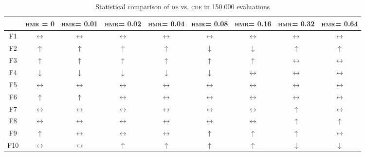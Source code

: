 \begin{table}[!t]
\caption{Statistical comparison of \textsc{de} vs. \textsc{cde} in 150.000 evaluations}
\label{tab:de_vs_cde_stats}
\centering
\begin{scriptsize}
\begin{tabular}{c c c c c c c c c}
\hline
     & \textsc{hmr} = 0  & \textsc{hmr}= 0.01 & \textsc{hmr}= 0.02 & \textsc{hmr}= 0.04 & \textsc{hmr}= 0.08 & \textsc{hmr}= 0.16 & \textsc{hmr}= 0.32 & \textsc{hmr}= 0.64 \\ \hline
F1	 & $\leftrightarrow$ & $\leftrightarrow$  & $\leftrightarrow$  & $\leftrightarrow$  & $\leftrightarrow$  & $\leftrightarrow$  & $\leftrightarrow$  & $\leftrightarrow$ \\ \hline 
F2	 & $\uparrow$        & $\uparrow$         & $\uparrow$         & $\uparrow$         & $\downarrow$       & $\downarrow$       & $\uparrow$         & $\uparrow$ \\ \hline 
F3	 & $\uparrow$        & $\uparrow$         & $\uparrow$         & $\uparrow$         & $\uparrow$         & $\uparrow$         & $\leftrightarrow$  & $\leftrightarrow$ \\ \hline 
F4	 & $\downarrow$      & $\downarrow$       & $\downarrow$       & $\downarrow$       &  $\downarrow$      & $\leftrightarrow$  & $\leftrightarrow$  & $\leftrightarrow$ \\ \hline 
F5	 & $\leftrightarrow$ & $\leftrightarrow$  & $\leftrightarrow$  & $\leftrightarrow$  & $\leftrightarrow$  & $\leftrightarrow$  & $\leftrightarrow$  & $\leftrightarrow$ \\ \hline 
F6	 & $\uparrow$        & $\uparrow$         & $\leftrightarrow$  & $\leftrightarrow$  & $\leftrightarrow$  & $\leftrightarrow$  & $\leftrightarrow$  & $\leftrightarrow$ \\ \hline 
F7	 & $\leftrightarrow$ & $\leftrightarrow$  & $\leftrightarrow$  & $\leftrightarrow$  & $\leftrightarrow$  & $\leftrightarrow$  & $\uparrow$         & $\leftrightarrow$ \\ \hline 
F8	 & $\leftrightarrow$ & $\leftrightarrow$  & $\leftrightarrow$  & $\leftrightarrow$  & $\leftrightarrow$  & $\leftrightarrow$  & $\uparrow$         & $\uparrow$ \\ \hline 
F9	 & $\uparrow$        & $\leftrightarrow$  & $\leftrightarrow$  & $\leftrightarrow$  & $\uparrow$         & $\uparrow$         & $\uparrow$         & $\leftrightarrow$ \\ \hline 
F10	 & $\leftrightarrow$ & $\leftrightarrow$  & $\uparrow$         & $\uparrow$         & $\uparrow$         & $\uparrow$         & $\downarrow$       & $\downarrow$ \\ \hline 

\end{tabular}
\end{scriptsize}
\end{table}
